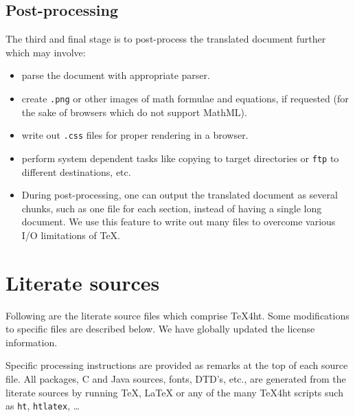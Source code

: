 \section{Post-processing}

The third and final stage is to post-process the translated
document further which may involve:

\begin{itemize}
\item parse the document with appropriate parser.

\item create \Verb=.png= or other images of math formulae
and equations, if requested (for the sake of browsers which do not
support MathML).

\item write out \Verb=.css= files for proper rendering in a
browser.

\item perform system dependent tasks like copying to target
directories or \Verb=ftp= to different destinations, etc.

\item During post-processing, one can output the translated document
as several chunks, such as one file for each section, instead of
having a single long document.  We use this feature to write out many
files to overcome various I/O limitations of \TeX{}.

\end{itemize}


\chapter{Literate sources}

Following are the literate source files which comprise \TeX{}4ht.
Some modifications to specific files are described below.  We have
globally updated the license information.

Specific processing instructions are provided as remarks at the top of
each source file.  All packages, C and Java sources, fonts, DTD's,
etc., are generated from the literate sources by running \TeX{},
\LaTeX{} or any of the many \TeX{}4ht scripts such as \Verb=ht=,
\Verb=htlatex=, \ldots

